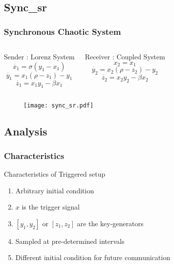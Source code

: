 \documentclass[xcolor=dvipsnames]{beamer}
\begin{document}
\subsection*{Sync_sr}
\begin{frame}
\frametitle{Synchronous Chaotic System}

\begin{columns}

\column{2in}
\begin{block}{Sender : Lorenz System}
\begin{equation*}
\dot{x_1} = \sigma ( y_1 - x_1 )
\end{equation*}
\begin{equation*}
\dot{y_1} = x_1 ( \rho - z_1 ) - y_1
\end{equation*}
\begin{equation*}
\dot{z_1} = {x_1}y_1 - \beta x_1
\end{equation*}
\end{block}

\column{2in}
\begin{block}{Receiver : Coupled System}
\begin{equation*}
x_2 = x_1
\end{equation*}
\begin{equation*}
\dot{y_2} = x_2 ( \rho - z_2 ) - y_2
\end{equation*}
\begin{equation*}
\dot{z_2} = {x_2}y_2 - \beta x_2
\end{equation*}
\end{block}

\end{columns}

\begin{figure}
\centering
\texttt{[image: sync\_sr.pdf]}
\end{figure}
\end{frame}

\subsection*{Analysis}
\begin{frame}
\frametitle{Characteristics}
\begin{block}{Characteristics of Triggered setup}
\end{block}
\begin{enumerate}
\item
\alert{Arbitrary} initial condition
\newline
\item
$x$ is the \alert{trigger} signal
\newline
\item
$[y_1, y_2]$ or $[z_1, z_2]$ are the key-generators
\newline
\item
Sampled at pre-determined intervals
\newline
\item
\alert{Different} initial condition for future communication
\end{enumerate}
\end{frame}
\end{document}
